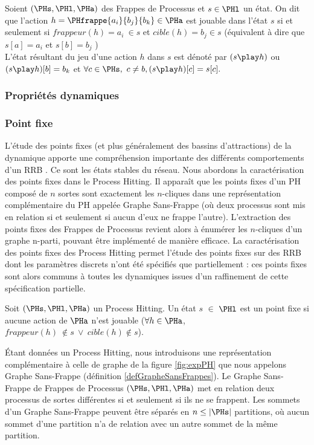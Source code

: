 \begin{definition} 
\label{def:actionJouable}
Soient $(\PHs,\PHl,\PHa)$ des Frappes de Processus et $s \in \PHl$ un état. On dit que l'action $h = \PHfrappe{a_i}{b_j}{b_k} \in \PHa$ est jouable dans l'état $s$ si et seulement si $frappeur(h)=a_i ~ \in s$ et $cible(h)=b_j \in s$ (équivalent à dire que $s[a]=a_i$ et $s[b]=b_j$ ) \\
L'état résultant du jeu d'une action $h$ dans $s$ est dénoté par $(s \play h)$ ou $(s \play h)[b]=b_k$ et $\forall c \in \PHs, ~ c \neq b, (s \play h)[c]=s[c].$
\end{definition}


\subsubsection{Propriétés dynamiques}

\subsubsection{Point fixe}
L’étude des points fixes (et plus généralement des bassins d’attractions) de la dynamique apporte une compréhension importante des différents comportements d’un RRB \cite{wuensche1998genomic}.
Ce sont les états stables du réseau.
Nous abordons la caractérisation des points fixes dans le Process Hitting. Il apparaît que les points fixes d'un PH composé de $n$ sortes sont exactement les $n$-cliques dans une représentation complémentaire du PH appelée Graphe Sans-Frappe (où deux processus sont mis en relation si et seulement si aucun d’eux ne frappe l’autre). L’extraction des points fixes des Frappes de Processus revient alors à énumérer les $n$-cliques d’un graphe n-parti, pouvant être implémenté de manière efficace.
La caractérisation des points fixes des Process Hitting permet l’étude des points fixes sur des RRB dont les paramètres discrets n’ont été spécifiés que partiellement : ces points fixes sont alors communs à toutes les dynamiques issues d’un raffinement de cette spécification partielle.

\begin{definition} 
Soit $(\PHs,\PHl,\PHa)$ un Process Hitting. Un état $s$ $\in$ $\PHl$ est un point fixe si aucune action de $\PHa$ n’est jouable ($\forall h \in \PHa$, $frappeur(h) ~ \notin s ~ \vee ~ cible(h) \notin s$).
\label{def1PointFixe}
\end{definition}

Étant données un Process Hitting, nous introduisons une représentation complémentaire
à celle de graphe de la figure \ref{fig:expPH} que nous appelons Graphe Sans-Frappe (définition \ref{defGrapheSansFrappes}). Le Graphe Sans-Frappe de Frappes de Processus $(\PHs,\PHl,\PHa)$ met en relation deux processus de sortes différentes si et seulement si ils ne se frappent. Les sommets d’un Graphe Sans-Frappe peuvent être séparés en $n \leq | \PHs |$  partitions, où aucun sommet d’une partition n’a de relation avec un autre sommet de la même partition.

